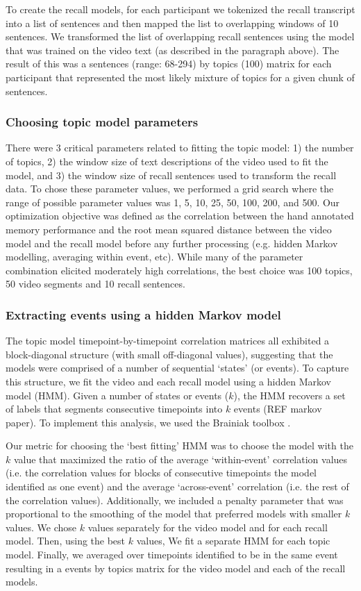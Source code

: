 \documentclass{article}
\begin{document}
{To create the recall models, for each participant we tokenized the recall transcript into a list of sentences and then mapped the list to overlapping windows of 10 sentences.  We transformed the list of overlapping recall sentences using the model that was trained on the video text (as described in the paragraph above). The result of this was a sentences (range: 68-294) by topics (100) matrix for each participant that represented the most likely mixture of topics for a given chunk of sentences.

\subsubsection{Choosing topic model parameters}
There were 3 critical parameters related to fitting the topic model: 1) the number of topics, 2) the window size of text descriptions of the video used to fit the model, and 3) the window size of recall sentences used to transform the recall data.  To chose these parameter values, we performed a grid search where the range of possible parameter values was 1, 5, 10, 25, 50, 100, 200, and 500. Our optimization objective was defined as the correlation between the hand annotated memory performance and the root mean squared distance between the video model and the recall model before any further processing (e.g. hidden Markov modelling, averaging within event, etc). While many of the parameter combination elicited moderately high correlations, the best choice was 100 topics, 50 video segments and 10 recall sentences.

\subsubsection{Extracting events using a hidden Markov model}
The topic model timepoint-by-timepoint correlation matrices all exhibited a block-diagonal structure (with small off-diagonal values), suggesting that the models were comprised of a number of sequential `states' (or events). To capture this structure, we fit the video and each recall model using a hidden Markov model (HMM). Given a number of states or events ($k$), the HMM recovers a set of labels that segments consecutive timepoints into $k$ events (REF markov paper). To implement this analysis, we used the Brainiak toolbox \citep{BaldEtal17}.

Our metric for choosing the `best fitting' HMM was to choose the model with the $k$ value that maximized the ratio of the average `within-event' correlation values (i.e. the correlation values for blocks of consecutive timepoints the model identified as one event) and the average `across-event' correlation (i.e. the rest of the correlation values). Additionally, we included a penalty parameter that was proportional to the smoothing of the model that preferred models with smaller $k$ values. We chose $k$ values separately for the video model and for each recall model.  Then, using the best $k$ values, We fit a separate HMM for each topic model. Finally, we averaged over timepoints identified to be in the same event resulting in a events by topics matrix for the video model and each of the recall models.
%
}
\end{document}
